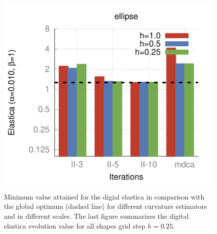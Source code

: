 \begin{figure}[]
{\includegraphics[scale=0.4]{figures/chapter5/flow/plots/bars/length_pen_0.01000/ellipse.pdf}
}\hspace{0.25em}%
%
\caption{Minimum value attained for the digial elastica  in comparison with the global optimum (dashed line) for different curvature estimators and in different scales. The last figure summarizes the digital elastica evolution value for all shapes  grid step $h=0.25$.}
\label{fig:local-comb-estimators-plots-lp001}
\end{figure}

